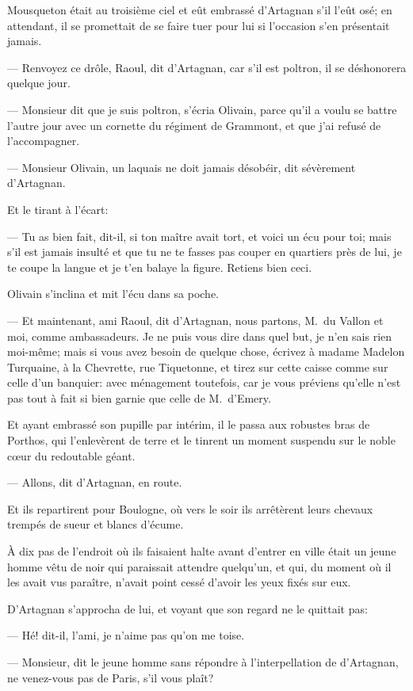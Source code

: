 Mousqueton était au troisième ciel et eût embrassé d'Artagnan s'il l'eût osé; en attendant, il se promettait de se faire tuer pour lui si l'occasion s'en présentait jamais.

— Renvoyez ce drôle, Raoul, dit d'Artagnan, car s'il est poltron, il se déshonorera quelque jour.

— Monsieur dit que je suis poltron, s'écria Olivain, parce qu'il a voulu se battre l'autre jour avec un cornette du régiment de Grammont, et que j'ai refusé de l'accompagner.

— Monsieur Olivain, un laquais ne doit jamais désobéir, dit sévèrement d'Artagnan.

Et le tirant à l'écart:

— Tu as bien fait, dit-il, si ton maître avait tort, et voici un écu pour toi; mais s'il est jamais insulté et que tu ne te fasses pas couper en quartiers près de lui, je te coupe la langue et je t'en balaye la figure. Retiens bien ceci.

Olivain s'inclina et mit l'écu dans sa poche.

— Et maintenant, ami Raoul, dit d'Artagnan, nous partons, M.~du Vallon et moi, comme ambassadeurs. Je ne puis vous dire dans quel but, je n'en sais rien moi-même; mais si vous avez besoin de quelque chose, écrivez à madame Madelon Turquaine, à la Chevrette, rue Tiquetonne, et tirez sur cette caisse comme sur celle d'un banquier: avec ménagement toutefois, car je vous préviens qu'elle n'est pas tout à fait si bien garnie que celle de M.~d'Emery.

Et ayant embrassé son pupille par intérim, il le passa aux robustes bras de Porthos, qui l'enlevèrent de terre et le tinrent un moment suspendu sur le noble cœur du redoutable géant.

— Allons, dit d'Artagnan, en route.

Et ils repartirent pour Boulogne, où vers le soir ils arrêtèrent leurs chevaux trempés de sueur et blancs d'écume.

À dix pas de l'endroit où ils faisaient halte avant d'entrer en ville était un jeune homme vêtu de noir qui paraissait attendre quelqu'un, et qui, du moment où il les avait vus paraître, n'avait point cessé d'avoir les yeux fixés sur eux.

D'Artagnan s'approcha de lui, et voyant que son regard ne le quittait pas:

— Hé! dit-il, l'ami, je n'aime pas qu'on me toise.

— Monsieur, dit le jeune homme sans répondre à l'interpellation de d'Artagnan, ne venez-vous pas de Paris, s'il vous plaît?


